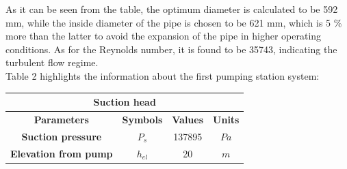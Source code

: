 \documentclass[12pt]{article}
\begin{document}
{\fontsize{12pt}{12pt}

\hspace*{1em} As it can be seen from the table, the optimum diameter is calculated to be 592 mm, while the inside diameter of the pipe is chosen to be 621 mm, which is 5 \% more than the latter to avoid the expansion of the pipe in higher operating conditions. As for the Reynolds number, it is found to be 35743, indicating the turbulent flow regime. \\

Table 2 highlights the information about the first pumping station system: \\
}
\begin{table}[H]
  \centering
  \begin{tabular}{|c|c|c|c|}
    \hline
    \multicolumn{4}{|c|}{\textbf{Suction head}} \\
  
    \hline
     \textbf{Parameters} & \textbf{Symbols} & \textbf{Values} & \textbf{Units}\\
    \hline
    \textbf{Suction pressure} & $P_{s}$ & 137895 & $Pa$ 
    \\
    \hline
    \textbf{Elevation from pump} & $h_{el}$ & 20 & $m$ \\
    \hline


\end{tabular}
\end{table}
\end{document}
